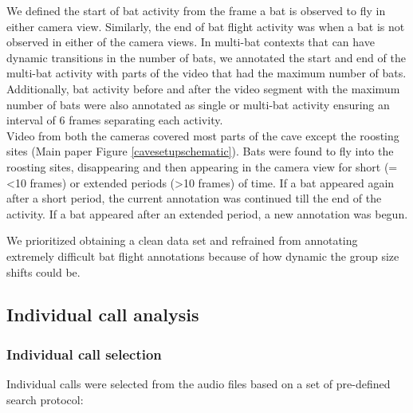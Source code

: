 \documentclass[
]{book}
\begin{document}
We defined the start of bat activity from the frame a bat is observed to fly in either camera view. Similarly, the end of bat flight activity was when a bat is not observed in either of the camera views. In multi-bat contexts that can have dynamic transitions in the number of bats, we annotated the start and end of the multi-bat activity with parts of the video that had the maximum number of bats. Additionally, bat activity before and after the video segment with the maximum number of bats were also annotated as single or multi-bat activity ensuring an interval of 6 frames separating each activity.\\
Video from both the cameras covered most parts of the cave except the roosting sites (Main paper Figure \ref{cavesetupschematic}). Bats were found to fly into the roosting sites, disappearing and then appearing in the camera view for short (=\textless10 frames) or extended periods (\textgreater10 frames) of time. If a bat appeared again after a short period, the current annotation was continued till the end of the activity. If a bat appeared after an extended period, a new annotation was begun.

We prioritized obtaining a clean data set and refrained from annotating extremely difficult bat flight annotations because of how dynamic the group size shifts could be.

\hypertarget{individual-call-analysis-2}{%
\subsection{Individual call analysis}\label{individual-call-analysis-2}}

\hypertarget{indcallprotocol}{%
\subsubsection{Individual call selection}\label{indcallprotocol}}

Individual calls were selected from the audio files based on a set of pre-defined search protocol:
\end{document}
